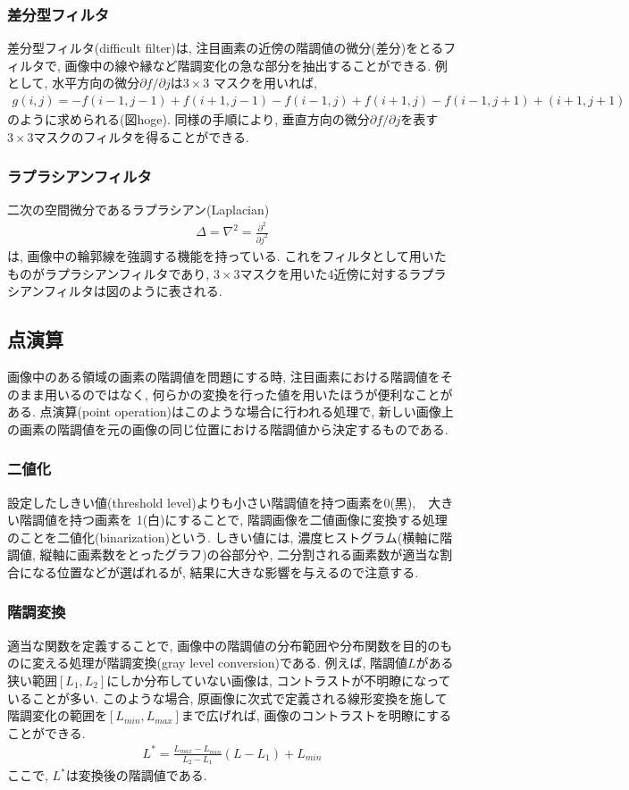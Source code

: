 \documentclass[a4paper,11pt,uplatex]{jsarticle}
\begin{document}
\subsubsection{差分型フィルタ}
差分型フィルタ(difficult filter)は, 注目画素の近傍の階調値の微分(差分)をとるフィルタで,
画像中の線や縁など階調変化の急な部分を抽出することができる. 例として, 水平方向の微分$\partial f / \partial j$は$3\times3$
マスクを用いれば,
\begin{align}
  g(i,j)=-f(i-1,j-1)+f(i+1,j-1)-f(i-1,j)+f(i+1,j)-f(i-1,j+1)+(i+1,j+1)
\end{align}
のように求められる(図hoge). 同様の手順により, 垂直方向の微分$\partial f / \partial j$を表す$3\times3$マスクのフィルタを得ることができる.
\subsubsection{ラプラシアンフィルタ}
二次の空間微分であるラプラシアン(Laplacian)
\begin{align}
  \Delta = \nabla^{2} = \frac{\partial^{2}}{\partial j^{2}}
\end{align}
は, 画像中の輪郭線を強調する機能を持っている. これをフィルタとして用いたものがラプラシアンフィルタであり,
$3\times3$マスクを用いた4近傍に対するラプラシアンフィルタは図のように表される.
\subsection{点演算}
画像中のある領域の画素の階調値を問題にする時, 注目画素における階調値をそのまま用いるのではなく,
何らかの変換を行った値を用いたほうが便利なことがある. 点演算(point operation)はこのような場合に行われる処理で,
新しい画像上の画素の階調値を元の画像の同じ位置における階調値から決定するものである.
\subsubsection{二値化}
設定したしきい値(threshold level)よりも小さい階調値を持つ画素を0(黒),　大きい階調値を持つ画素を
1(白)にすることで, 階調画像を二値画像に変換する処理のことを二値化(binarization)という.
しきい値には, 濃度ヒストグラム(横軸に階調値, 縦軸に画素数をとったグラフ)の谷部分や, 二分割される画素数が適当な割合になる位置などが選ばれるが,
結果に大きな影響を与えるので注意する.
\subsubsection{階調変換}
適当な関数を定義することで, 画像中の階調値の分布範囲や分布関数を目的のものに変える処理が階調変換(gray level conversion)である.
例えば, 階調値$L$がある狭い範囲$[L_1,L_2]$にしか分布していない画像は, コントラストが不明瞭になっていることが多い.
このような場合, 原画像に次式で定義される線形変換を施して階調変化の範囲を$[L_{min},L_{max}]$まで広げれば, 画像のコントラストを明瞭にすることができる.
\begin{align}
  L^{*} = \frac{L_{max}-L_{min}}{L_2-L_1}(L-L_1)+L_{min}
\end{align}
ここで, $L^{*}$は変換後の階調値である.
\end{document}
